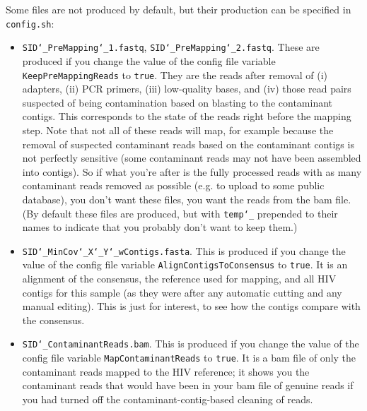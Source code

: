 \documentclass{article}
\let\c\texttt
\begin{document}
Some files are not produced by default, but their production can be specified in \c{config.sh}:
\begin{itemize}
\item \c{SID\char`_PreMapping\char`_1.fastq}, \c{SID\char`_PreMapping\char`_2.fastq}.
These are produced if you change the value of the config file variable \c{KeepPreMappingReads} to \c{true}.
They are the reads after removal of (i) adapters, (ii) PCR primers, (iii) low-quality bases, and (iv) those read pairs suspected of being contamination based on blasting to the contaminant contigs.
This corresponds to the state of the reads right before the mapping step.
Note that not all of these reads will map, for example because the removal of suspected contaminant reads based on the contaminant contigs is not perfectly sensitive (some contaminant reads may not have been assembled into contigs).
So if what you're after is the fully processed reads with as many contaminant reads removed as possible (e.g. to upload to some public database), you don't want these files, you want the reads from the bam file.
(By default these files are produced, but with \c{temp\char`_} prepended to their names to indicate that you probably don't want to keep them.)
\item \c{SID\char`_MinCov\char`_X\char`_Y\char`_wContigs.fasta}.
This is produced if you change the value of the config file variable \c{AlignContigsToConsensus} to \c{true}.
It is an alignment of the consensus, the reference used for mapping, and all HIV contigs for this sample (as they were after any automatic cutting and any manual editing).
This is just for interest, to see how the contigs compare with the consensus.
\item \c{SID\char`_ContaminantReads.bam}.
This is produced if you change the value of the config file variable \c{MapContaminantReads} to \c{true}.
It is a bam file of only the contaminant reads mapped to the HIV reference; it shows you the contaminant reads that would have been in your bam file of genuine reads if you had turned off the contaminant-contig-based cleaning of reads.
\end{itemize}
\end{document}
